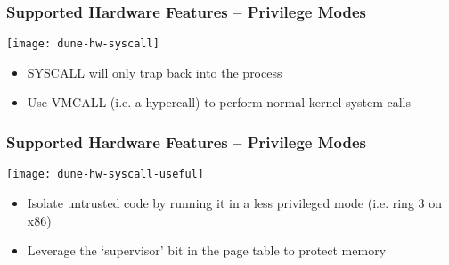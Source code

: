 \begin{frame}[plain]
	\frametitle{ Supported Hardware Features -- Privilege Modes}
	
	\centering
	
	
	\texttt{[image: dune-hw-syscall]}
	
	\begin{itemize}
		\item  SYSCALL	
 will	
 only	
 trap	
 back	
 into	
 the	
 process	
  
		
		\item Use	
 VMCALL	
 (i.e.	
 a	
 hypercall)	
 to	
 perform	normal	
 kernel	
 system	
 calls	
 
		
	\end{itemize}	
	
\end{frame}


\begin{frame}[plain]
	\frametitle{ Supported Hardware Features -- Privilege Modes}
	
	\centering
	
	
	\texttt{[image: dune-hw-syscall-useful]}
	
	\begin{itemize}
		\item  Isolate	
 untrusted	
 code	
 by	
 running	
 it	
 in	
 a	
 less	privileged	
 mode	
 (i.e.	
 ring	
 3	
 on	
 x86)	 
		
		\item Leverage	
 the	
 ‘supervisor’	
 bit	
 in	
 the	
 page	
 table	
  	to	
 protect	
 memory	
  
			
 
		
	\end{itemize}	
	
\end{frame}


